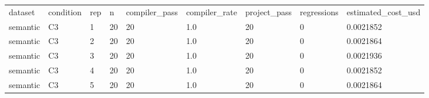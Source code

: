 \begin{tabular}{lllllllll}
dataset & condition & rep & n & compiler\_pass & compiler\_rate & project\_pass & regressions & estimated\_cost\_usd \\
semantic & C3 & 1 & 20 & 20 & 1.0 & 20 & 0 & 0.0021852 \\
semantic & C3 & 2 & 20 & 20 & 1.0 & 20 & 0 & 0.0021864 \\
semantic & C3 & 3 & 20 & 20 & 1.0 & 20 & 0 & 0.0021936 \\
semantic & C3 & 4 & 20 & 20 & 1.0 & 20 & 0 & 0.0021852 \\
semantic & C3 & 5 & 20 & 20 & 1.0 & 20 & 0 & 0.0021864 \\
\end{tabular}